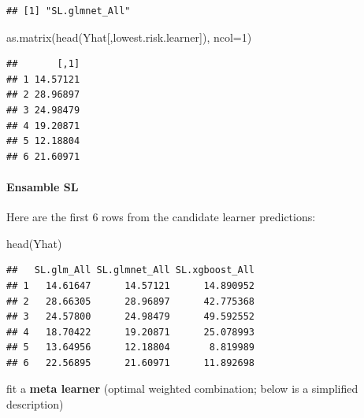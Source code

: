 \documentclass[
]{book}
\newenvironment{Shaded}{\begin{snugshade}}{\end{snugshade}}
\newcommand{\AttributeTok}[1]{\textcolor[rgb]{0.77,0.63,0.00}{#1}}
\newcommand{\DecValTok}[1]{\textcolor[rgb]{0.00,0.00,0.81}{#1}}
\newcommand{\FunctionTok}[1]{\textcolor[rgb]{0.00,0.00,0.00}{#1}}
\newcommand{\NormalTok}[1]{#1}
\begin{document}
\begin{verbatim}
## [1] "SL.glmnet_All"
\end{verbatim}

\begin{Shaded}
\begin{Highlighting}[]
\FunctionTok{as.matrix}\NormalTok{(}\FunctionTok{head}\NormalTok{(Yhat[,lowest.risk.learner]), }
          \AttributeTok{ncol=}\DecValTok{1}\NormalTok{)}
\end{Highlighting}
\end{Shaded}

\begin{verbatim}
##       [,1]
## 1 14.57121
## 2 28.96897
## 3 24.98479
## 4 19.20871
## 5 12.18804
## 6 21.60971
\end{verbatim}

\hypertarget{ensamble-sl}{%
\paragraph{Ensamble SL}\label{ensamble-sl}}

Here are the first 6 rows from the candidate learner predictions:

\begin{Shaded}
\begin{Highlighting}[]
\FunctionTok{head}\NormalTok{(Yhat)}
\end{Highlighting}
\end{Shaded}

\begin{verbatim}
##   SL.glm_All SL.glmnet_All SL.xgboost_All
## 1   14.61647      14.57121      14.890952
## 2   28.66305      28.96897      42.775368
## 3   24.57800      24.98479      49.592552
## 4   18.70422      19.20871      25.078993
## 5   13.64956      12.18804       8.819989
## 6   22.56895      21.60971      11.892698
\end{verbatim}

\begin{rmdcomment}
fit a \textbf{meta learner} (optimal weighted combination; below is a
simplified description)
\end{rmdcomment}
\end{document}
